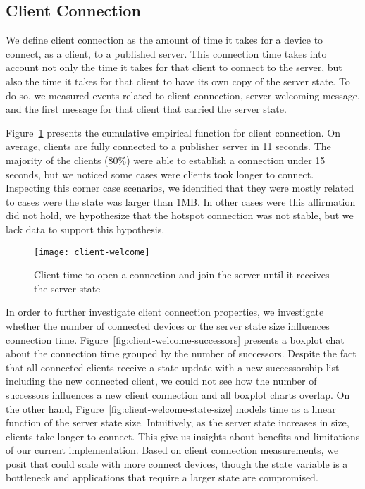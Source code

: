 \subsection{Client Connection}
\label{sub:eval:connection}


We define client connection as the amount of time it takes for a device to connect, as a client, to a published server.
This connection time takes into account not only the time it takes for that client to connect to the server, 
but also the time it takes for that client to have its own copy of the server state. 
To do so, we measured events related to client connection, server welcoming message, and the first message for that client that carried the server state.


Figure~\ref{fig:client-welcome} presents the cumulative empirical function for client connection.
On average, clients are fully connected to a publisher server in 11 seconds. 
The majority of the clients (80\%) were able to establish a connection under 15 seconds, 
but we noticed some cases were clients took longer to connect. 
Inspecting this corner case scenarios, we identified that they were mostly related to cases were the state was larger than 1MB.
In other cases were this affirmation did not hold, we hypothesize that the hotspot connection was not stable, but we lack data to support this hypothesis.


\begin{figure}
    \centering
    \texttt{[image: client-welcome]}
    \caption{Client time to open a connection and join the server until it receives the server state}
    \label{fig:client-welcome}
\end{figure}


In order to further investigate client connection properties, we investigate whether the number of connected devices or the server state size influences connection time.
Figure~\ref{fig:client-welcome-successors} presents a boxplot chat about the connection time grouped by the number of successors.
Despite the fact that all connected clients receive a state update with a new successorship list including the new connected client, 
we could not see how the number of successors influences a new client connection and all boxplot charts overlap.
On the other hand, Figure~\ref{fig:client-welcome-state-size} models time as a linear function of the server state size.
Intuitively, as the server state increases in size, clients take longer to connect. 
This give us insights about benefits and limitations of our current implementation.
Based on client connection measurements, we posit that \APIshort could scale with more connect devices, though the state variable is a bottleneck and applications that require a larger state are compromised.


